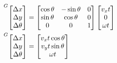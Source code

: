 \begin{align*}
  \prescript{G}{}{\begin{bmatrix}
    \Delta x \\
    \Delta y \\
    \Delta \theta
  \end{bmatrix}} &=
  \begin{bmatrix}
    \cos\theta & -\sin\theta & 0 \\
    \sin\theta &  \cos\theta & 0 \\
             0 &           0 & 1
  \end{bmatrix}
  \begin{bmatrix}
    v_x t \\
    0 \\
    \omega t
  \end{bmatrix} \\
  \prescript{G}{}{\begin{bmatrix}
    \Delta x \\
    \Delta y \\
    \Delta \theta
  \end{bmatrix}} &=
  \begin{bmatrix}
    v_x t \cos\theta \\
    v_y t \sin\theta \\
    \omega t
  \end{bmatrix}
\end{align*}

